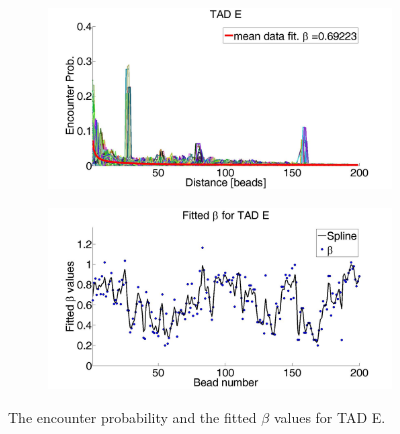 \documentclass[12pt]{article}
\begin{document}
\begin{figure}[H]
 \begin{subfigure}[b]{0.3\textwidth}
 \includegraphics[scale=0.2]{meanDataFitTADE}
 \caption{}
 \end{subfigure}
 
 \begin{subfigure}[b]{0.3\textwidth}
\includegraphics[scale=0.2]{fittedExpValuesWithSplineAverageTADE}
\caption{}
 \end{subfigure}
\caption{The encounter probability and the fitted $\beta$ values for TAD E.}
\end{figure}
\end{document}
